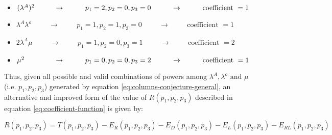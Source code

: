 \begin{itemize}
    \item \((\lambda^A)^2 \hspace{0.95cm} \rightarrow \hspace{1cm} p_1 = 2, p_2=0, p_3=0 \hspace{1cm} \rightarrow \hspace{1cm} \text{coefficient } = 1\)
    \item \(\lambda^A \lambda^o \hspace{1cm} \rightarrow \hspace{1cm} p_1 = 1, p_2=1, p_3=0 \hspace{1cm} \rightarrow \hspace{1cm} \text{coefficient } = 1\)
    \item \(2 \lambda^A \mu \hspace{1cm} \rightarrow \hspace{1cm} p_1 = 1, p_2=0, p_3=1 \hspace{1cm} \rightarrow \hspace{1cm} \text{coefficient } = 2\)
    \item \(\mu^2 \hspace{1.45cm} \rightarrow \hspace{1cm} p_1=0, p_2=0, p_3=2 \hspace{1cm} \rightarrow \hspace{1cm} \text{coefficient } = 1\)
\end{itemize}

Thus, given all possible and valid combinations of powers among \(\lambda^A, \lambda^o \text{ and } \mu\) (i.e. \(p_1,p_2,p_3\)) generated by equation \ref{eq:columns-conjecture-general}, an alternative and improved form of the value of \(R(p_1, p_2, p_3)\) described in equation \ref{eq:coefficient-function} is given by:

\begin{equation} \label{eq:permutation formula}
    R(p_1, p_2, p_3) = T(p_1, p_2, p_3) - E_R(p_1, p_2, p_3) - E_D(p_1, p_2, p_3) - E_L(p_1, p_2, p_3) - E_{RL}(p_1, p_2, p_3)
\end{equation}

